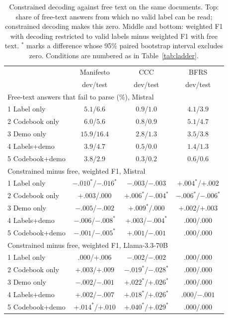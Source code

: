 \documentclass[11pt]{article}
\begin{document}
\begin{table}[!t]
\centering
\begin{tabular}{lccc}
\toprule
 & Manifesto & CCC & BFRS \\
 & dev/test & dev/test & dev/test \\
\midrule
\multicolumn{4}{l}{Free-text answers that fail to parse (\%), Mistral} \\
1 Label only & $5.1$/$6.6$ & $0.9$/$1.0$ & $4.1$/$3.9$ \\
2 Codebook only & $6.0$/$5.6$ & $0.8$/$0.9$ & $5.1$/$4.7$ \\
3 Demo only & $15.9$/$16.4$ & $2.8$/$1.3$ & $3.5$/$3.8$ \\
4 Labels+demo & $3.9$/$4.7$ & $0.5$/$0.0$ & $1.4$/$1.3$ \\
5 Codebook+demo & $3.8$/$2.9$ & $0.3$/$0.2$ & $0.6$/$0.6$ \\
\midrule
\multicolumn{4}{l}{Constrained minus free, weighted F1, Mistral} \\
1 Label only & $-.010^*$/$-.016^*$ & $-.003$/$-.003$ & $+.004^*$/$+.002$ \\
2 Codebook only & $+.003$/$.000$ & $+.006^*$/$-.004^*$ & $-.006^*$/$-.006^*$ \\
3 Demo only & $-.005$/$-.002$ & $+.009^*$/$.000$ & $+.002$/$+.003$ \\
4 Labels+demo & $-.006$/$-.008^*$ & $+.003$/$-.004^*$ & $.000$/$.000$ \\
5 Codebook+demo & $-.001$/$-.005^*$ & $+.001$/$-.001$ & $.000$/$.000$ \\
\midrule
\multicolumn{4}{l}{Constrained minus free, weighted F1, Llama-3.3-70B} \\
1 Label only & $.000$/$+.006$ & $-.002$/$-.002$ & $.000$/$.000$ \\
2 Codebook only & $+.003$/$+.009$ & $-.019^*$/$-.028^*$ & $.000$/$.000$ \\
3 Demo only & $-.002$/$-.001$ & $+.022^*$/$+.026^*$ & $.000$/$.000$ \\
4 Labels+demo & $+.002$/$-.007$ & $+.018^*$/$+.026^*$ & $.000$/$-.001$ \\
5 Codebook+demo & $+.014^*$/$+.010$ & $+.040^*$/$+.029^*$ & $.000$/$.000$ \\
\bottomrule
\end{tabular}
\caption{Constrained decoding against free text on the same documents. Top: share of free-text answers from which no valid label can be read; constrained decoding makes this zero. Middle and bottom: weighted F1 with decoding restricted to valid labels minus weighted F1 with free text. $^*$ marks a difference whose 95\% paired bootstrap interval excludes zero. Conditions are numbered as in Table~\ref{tab:ladder}.}
\label{tab:constrained}
\end{table}
\end{document}
